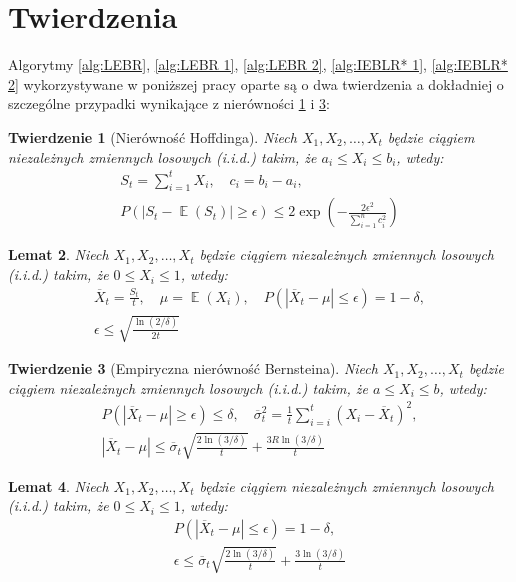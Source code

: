 \documentclass[inzynierska]{pwr_wmat_praca_dyplomowa}
\theoremstyle{plain}
\newtheorem{theorem}{Twierdzenie}
\numberwithin{theorem}{chapter}
\newtheorem{lemma}[theorem]{Lemat}
\theoremstyle{definition}
\numberwithin{theorem}{chapter}
\DeclareMathOperator{\EX}{\mathbb{E}}%
\begin{document}
	\section{Twierdzenia}
	Algorytmy \ref{alg:LEBR}, \ref{alg:LEBR 1}, \ref{alg:LEBR 2}, \ref{alg:IEBLR* 1}, \ref{alg:IEBLR* 2} wykorzystywane w poniższej pracy oparte są o dwa twierdzenia a dokładniej o szczególne przypadki wynikające z nierówności \ref{Hoffding ineq} i \ref{Bernsteina emp ineq}:
	\begin{theorem}[Nierówność Hoffdinga]
		\label{Hoffding ineq}
		Niech $X_1,X_2,\dots,X_t$ będzie ciągiem niezależnych zmiennych losowych (i.i.d.) takim, że $a_i \le X_i \le b_i$, wtedy:
		\begin{gather*}
			S_t = \sum_{i=1}^{t} X_i,\quad c_i = b_i - a_i, \\
			P(|S_t - \EX(S_t)| \ge \epsilon ) \le 2\exp\left( -\frac{2\epsilon^2}{\sum_{i=1}^{n} c_i^2} \right)
		\end{gather*}
	\end{theorem}
	\begin{lemma}
		\label{Hoffding ineq lemma}
		Niech $X_1,X_2,\dots,X_t$ będzie ciągiem niezależnych zmiennych losowych (i.i.d.) takim, że $0 \le X_i \le 1$, wtedy:
		\begin{gather*}
			\overline{X}_t = \frac{S_t}{t},\quad 
			\mu = \EX(X_i),\quad  	
			P(|\overline{X}_t - \mu | \le \epsilon ) = 1 - \delta, \\
			\epsilon \le  \sqrt{\frac{\ln(2/\delta)}{2t}}   
		\end{gather*}
	\end{lemma}

		\begin{theorem}[Empiryczna nierówność Bernsteina]
		\label{Bernsteina emp ineq}
		Niech $X_1,X_2,\dots,X_t$ będzie ciągiem niezależnych zmiennych losowych (i.i.d.) takim, że $a \le X_i \le b$, wtedy:
		\begin{gather*}
			P(|\overline{X}_t - \mu| \ge \epsilon ) \le  \delta, \quad \overline \sigma_t^2 = \frac{1}{t}\sum_{i=i}^{t}(X_i - \overline{X}_t)^2, \\
			|\overline{X}_t - \mu | \le \overline{\sigma}_t \sqrt{\frac{2\ln(3/\delta)}{t}} + \frac{3 R \ln{(3 / \delta)}}{t}
		\end{gather*}
	\end{theorem}
	\begin{lemma}\label{Bernsteina emp ineq lemma}
		Niech $X_1,X_2,\dots,X_t$ będzie ciągiem niezależnych zmiennych losowych (i.i.d.) takim, że $0 \le X_i \le 1$, wtedy:
		\begin{gather*}
			P(|\overline{X}_t - \mu | \le \epsilon ) = 1 - \delta,\\
			\epsilon \le \overline{\sigma}_t \sqrt{\frac{2\ln(3/\delta)}{t}} + \frac{3  \ln{(3 / \delta)}}{t}
		\end{gather*}
	\end{lemma}
\end{document}

